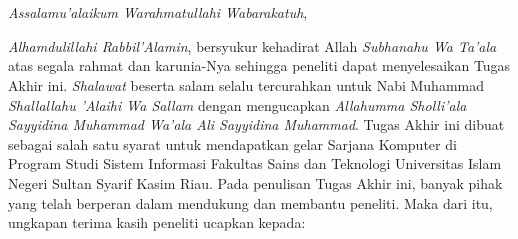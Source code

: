 %
%
%
%

\chapter*{\kataPengantar}

\textit{Assalamu’alaikum Warahmatullahi Wabarakatuh},

\textit{Alhamdulillahi Rabbil’Alamin}, bersyukur kehadirat Allah \textit{Subhanahu Wa Ta’ala} atas segala rahmat dan karunia-Nya sehingga peneliti dapat menyelesaikan Tugas Akhir ini. \textit{Shalawat} beserta salam selalu tercurahkan untuk Nabi Muhammad \textit{Shallallahu ’Alaihi Wa Sallam} dengan mengucapkan \textit{Allahumma Sholli’ala Sayyidina Muhammad Wa’ala Ali Sayyidina Muhammad}. Tugas Akhir ini dibuat sebagai salah satu syarat untuk mendapatkan gelar Sarjana Komputer di Program Studi Sistem Informasi Fakultas Sains dan Teknologi Universitas Islam Negeri Sultan Syarif Kasim Riau. Pada penulisan Tugas Akhir ini, banyak pihak yang telah berperan dalam mendukung dan membantu peneliti. Maka dari itu, ungkapan terima kasih peneliti ucapkan kepada:


